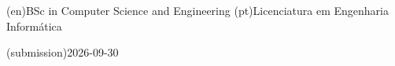 %
%
%



%
%
%
\ntauthordegree(en){BSc in Computer Science and Engineering}
\ntauthordegree(pt){Licenciatura em Engenharia Informática}



%
%
%



%
%
\ntdate(submission){2026-09-30}



